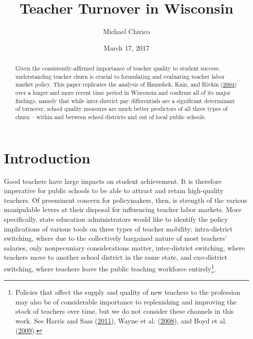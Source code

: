 \documentclass[]{article}
\title{Teacher Turnover in Wisconsin}
\author{Michael Chirico}
\date{March 17, 2017}
\let\rmarkdownfootnote\footnote%
\def\footnote{\protect\rmarkdownfootnote}
\begin{document}
\maketitle
\begin{abstract}
Given the consistently-affirmed importance of teacher quality to student
success, understanding teacher churn is crucial to formulating and
evaluating teacher labor market policy. This paper replicates the
analysis of Hanushek, Kain, and Rivkin
(\protect\hyperlink{ref-hanushek}{2004}) over a longer and more recent
time period in Wisconsin and confirms all of its major findings, namely
that while inter-district pay differentials are a significant
determinant of turnover, school quality measures are much better
predictors of all three types of churn -- within and between school
districts and out of local public schools.
\end{abstract}

\section{Introduction}\label{introduction}

Good teachers have large impacts on student achievement. It is therefore
imperative for public schools to be able to attract and retain
high-quality teachers. Of preeminent concern for policymakers, then, is
strength of the various manipulable levers at their disposal for
influencing teacher labor markets. More specifically, state education
administrators would like to identify the policy implications of various
tools on three types of teacher mobility: intra-district switching,
where due to the collectively bargained nature of most teachers'
salaries, only nonpecuniary considerations matter, inter-district
switching, where teachers move to another school district in the same
state, and exo-district switching, where teachers leave the public
teaching workforce entirely\footnote{Policies that affect the supply and
  quality of new teachers to the profession may also be of considerable
  importance to replenishing and improving the stock of teachers over
  time, but we do not consider these channels in this work. See Harris
  and Sass (\protect\hyperlink{ref-harris}{2011}), Wayne et al.
  (\protect\hyperlink{ref-wayne}{2008}), and Boyd et al.
  (\protect\hyperlink{ref-boyd2009}{2009}).}.
\end{document}
